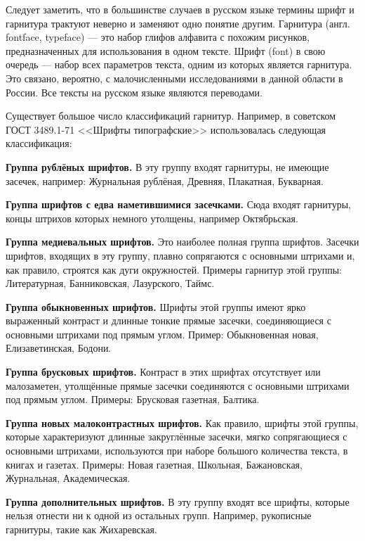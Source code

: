Следует заметить, что в большинстве случаев в русском языке термины шрифт и гарнитура трактуют неверно и заменяют одно понятие другим. Гарнитура (англ. fontface, typeface) --- это набор глифов алфавита с похожим рисунков, предназначенных для использования в одном тексте. Шрифт (font) в свою очередь --- набор всех параметров текста, одним из которых является гарнитура. Это связано, вероятно, с малочисленными исследованиями в данной области в России. Все тексты на русском языке являются переводами.

Существует большое число классификаций гарнитур. Например, в советском ГОСТ 3489.1-71 <<Шрифты типографские>>\cite{GOST3489} использовалась следующая классификация:

\begin{enumerate*}
	\item \textbf{Группа рублёных шрифтов.} В эту группу входят гарнитуры, не имеющие засечек, например: Журнальная рублёная, Древняя, Плакатная, Букварная.
	\item \textbf{Группа шрифтов с едва наметившимися засечками.} Сюда входят гарнитуры, концы штрихов которых немного утолщены, например Октябрьская.
	\item \textbf{Группа медиевальных шрифтов.} Это наиболее полная группа шрифтов. Засечки шрифтов, входящих в эту группу, плавно сопрягаются с основными штрихами и, как правило, строятся как дуги окружностей. Примеры гарнитур этой группы: Литературная, Банниковская, Лазурского, Таймс.
	\item \textbf{Группа обыкновенных шрифтов.} Шрифты этой группы имеют ярко выраженный контраст и длинные тонкие прямые засечки, соединяющиеся с основными штрихами под прямым углом. Пример: Обыкновенная новая, Елизаветинская, Бодони.
	\item \textbf{Группа брусковых шрифтов.} Контраст в этих шрифтах отсутствует или малозаметен, утолщённые прямые засечки соединяются с основными штрихами под прямым углом. Примеры: Брусковая газетная, Балтика.
	\item \textbf{Группа новых малоконтрастных шрифтов.} Как правило, шрифты этой группы, которые характеризуют длинные закруглённые засечки, мягко сопрягающиеся с основными штрихами, используются при наборе большого количества текста, в книгах и газетах. Примеры: Новая газетная, Школьная, Бажановская, Журнальная, Академическая.
	\item \textbf{Группа дополнительных шрифтов.} В эту группу входят все шрифты, которые нельзя отнести ни к одной из остальных групп. Например, рукописные гарнитуры, такие как Жихаревская.
\end{enumerate*}

